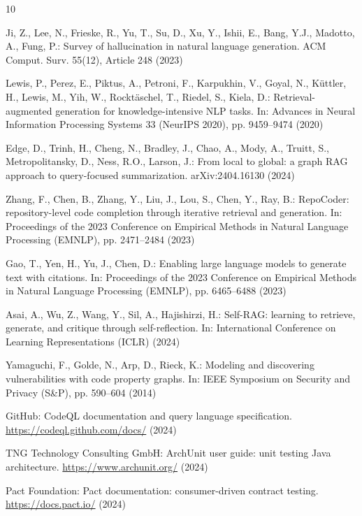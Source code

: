 \documentclass[runningheads]{llncs}
\begin{document}

\begin{thebibliography}{10}

Ji, Z., Lee, N., Frieske, R., Yu, T., Su, D., Xu, Y., Ishii, E., Bang, Y.J., Madotto, A., Fung, P.: Survey of hallucination in natural language generation. ACM Comput. Surv. 55(12), Article 248 (2023)

Lewis, P., Perez, E., Piktus, A., Petroni, F., Karpukhin, V., Goyal, N., K{\"u}ttler, H., Lewis, M., Yih, W., Rockt{\"a}schel, T., Riedel, S., Kiela, D.: Retrieval-augmented generation for knowledge-intensive NLP tasks. In: Advances in Neural Information Processing Systems 33 (NeurIPS 2020), pp. 9459--9474 (2020)

Edge, D., Trinh, H., Cheng, N., Bradley, J., Chao, A., Mody, A., Truitt, S., Metropolitansky, D., Ness, R.O., Larson, J.: From local to global: a graph RAG approach to query-focused summarization. arXiv:2404.16130 (2024)

Zhang, F., Chen, B., Zhang, Y., Liu, J., Lou, S., Chen, Y., Ray, B.: RepoCoder: repository-level code completion through iterative retrieval and generation. In: Proceedings of the 2023 Conference on Empirical Methods in Natural Language Processing (EMNLP), pp. 2471--2484 (2023)

Gao, T., Yen, H., Yu, J., Chen, D.: Enabling large language models to generate text with citations. In: Proceedings of the 2023 Conference on Empirical Methods in Natural Language Processing (EMNLP), pp. 6465--6488 (2023)

Asai, A., Wu, Z., Wang, Y., Sil, A., Hajishirzi, H.: Self-RAG: learning to retrieve, generate, and critique through self-reflection. In: International Conference on Learning Representations (ICLR) (2024)

Yamaguchi, F., Golde, N., Arp, D., Rieck, K.: Modeling and discovering vulnerabilities with code property graphs. In: IEEE Symposium on Security and Privacy (S\&P), pp. 590--604 (2014)

GitHub: CodeQL documentation and query language specification. \url{https://codeql.github.com/docs/} (2024)

TNG Technology Consulting GmbH: ArchUnit user guide: unit testing Java architecture. \url{https://www.archunit.org/} (2024)

Pact Foundation: Pact documentation: consumer-driven contract testing. \url{https://docs.pact.io/} (2024)


\end{thebibliography}
\end{document}
